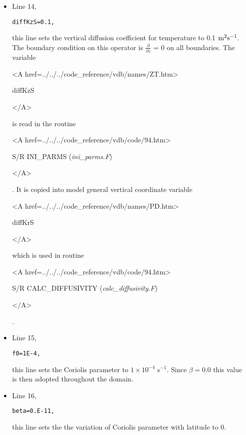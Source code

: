 \begin{itemize}
\item Line 14,
\begin{verbatim}
diffKzS=0.1,
\end{verbatim}
this line sets the vertical diffusion coefficient for temperature
to 0.1 ${\rm m^{2}s^{-1}}$. The boundary condition on this
operator is $\frac{\partial}{\partial z}$ = 0 on all boundaries.
The variable
{\bf
\begin{rawhtml} <A href=../../../code_reference/vdb/names/ZT.htm> \end{rawhtml}
diffKzS
\begin{rawhtml} </A>\end{rawhtml}
}
is read in the routine
{\it
\begin{rawhtml} <A href=../../../code_reference/vdb/code/94.htm> \end{rawhtml}
S/R INI\_PARMS ({\it ini\_parms.F})
\begin{rawhtml} </A>\end{rawhtml}
}.
It is copied into model general vertical coordinate variable
{\bf
\begin{rawhtml} <A href=../../../code_reference/vdb/names/PD.htm> \end{rawhtml}
diffKrS
\begin{rawhtml} </A>\end{rawhtml}
} which is used in routine 
{\it 
\begin{rawhtml} <A href=../../../code_reference/vdb/code/94.htm> \end{rawhtml}
S/R CALC\_DIFFUSIVITY ({\it calc\_diffusivity.F})
\begin{rawhtml} </A>\end{rawhtml}
}.


\item Line 15,
\begin{verbatim}
f0=1E-4,
\end{verbatim}
this line sets the Coriolis parameter to $1 \times 10^{-4}$ s$^{-1}$. 
Since $\beta = 0.0$ this value is then adopted throughout the domain.

 
\item Line 16,
\begin{verbatim}
beta=0.E-11,
\end{verbatim}
this line sets the the variation of Coriolis parameter with latitude to $0$.



\end{itemize}
